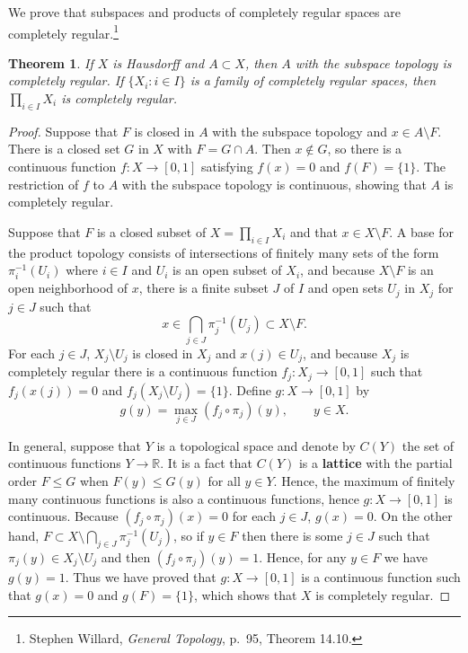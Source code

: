 \documentclass{article}
\newtheorem{theorem}{Theorem}
\theoremstyle{definition}
\begin{document}
We  prove that subspaces and products of completely regular spaces are completely regular.\footnote{Stephen Willard, {\em General Topology}, p.~95, Theorem 14.10.} 

\begin{theorem}
If $X$ is Hausdorff and $A \subset X$, then $A$ with the subspace topology is completely regular. If
$\{X_i: i \in I\}$ is a family of completely regular spaces, then $\prod_{i \in I} X_i$ is completely
regular.
\end{theorem}
\begin{proof}
Suppose that $F$ is closed in $A$ with the subspace topology and $x \in A \setminus F$. There is a closed set $G$ in $X$
with $F=G \cap A$.  Then $x \not \in G$, so there is a continuous function $f:X \to [0,1]$ satisfying
$f(x)=0$ and $f(F)=\{1\}$. The restriction of $f$ to $A$ with the subspace topology is continuous, showing that $A$ is completely regular. 

Suppose that $F$ is a closed subset of $X=\prod_{i \in I} X_i$ and that $x \in X \setminus F$. 
A base for the product topology consists of intersections of finitely many sets of the form
$\pi_i^{-1}(U_i)$ where $i \in I$ and $U_i$ is an open subset of $X_i$, and because
$X \setminus F$ is an open neighborhood of $x$, there  is a  finite
subset $J$ of $I$ and open sets $U_j$ in $X_j$ for $j \in J$ such that
\[
x \in \bigcap_{j \in J} \pi_j^{-1}(U_j) \subset X \setminus F.
\]
For each $j \in J$,   $X_j \setminus U_j$ is closed in $X_j$ and $x(j) \in U_j$, and because $X_j$ is completely
regular there is a continuous function $f_j:X_j \to [0,1]$ such that $f_j(x(j))=0$ and $f_j(X_j \setminus U_j)=\{1\}$. 
Define $g:X \to [0,1]$ by
\[
g(y)=\max_{j \in J} (f_j \circ \pi_j) (y), \qquad y \in X.
\]

In general, suppose that $Y$ is a topological space and denote by $C(Y)$ the set of continuous functions $Y \to \mathbb{R}$. It is 
a fact that  $C(Y)$
is a \textbf{lattice} with the partial order $F \leq G$ when $F(y) \leq G(y)$ for all $y \in Y$. Hence, the maximum of finitely many
continuous functions is also a continuous functions, hence $g:X \to [0,1]$ is continuous. 
Because $(f_j \circ \pi_j)(x)=0$ for each $j \in J$, $g(x)=0$. On the other hand, $F \subset X \setminus \bigcap_{j \in J} \pi_j^{-1}(U_j)$, so
if $y \in F$ then there is some  $j \in J$ such that $\pi_j(y) \in X_j \setminus U_j$ and then $(f_j \circ \pi_j)(y)=1$. Hence, for any $y \in F$ we have
$g(y)=1$. Thus we have proved that $g:X \to [0,1]$ is a continuous function such that $g(x)=0$ and $g(F)=\{1\}$, which shows that
$X$ is completely regular.
\end{proof}
\end{document}
